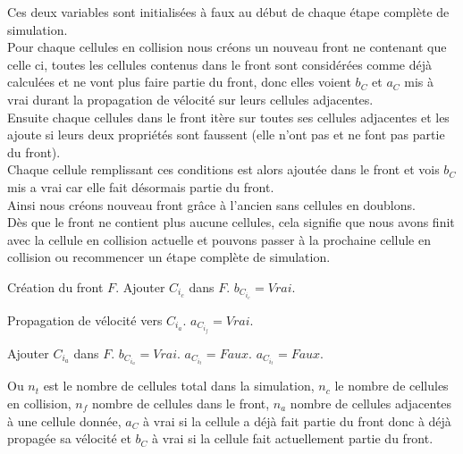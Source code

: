 \documentclass[a4paper,11pt]{article}
\begin{document}
Ces deux variables sont initialisées à faux au début de chaque étape complète de simulation.\\
Pour chaque cellules en collision nous créons un nouveau front ne contenant que celle ci, toutes les cellules contenus dans le front sont considérées comme déjà calculées et ne vont plus faire partie du front, donc elles voient $b_C$ et $a_C$ mis à vrai durant la propagation de vélocité sur leurs cellules adjacentes.\\
Ensuite chaque cellules dans le front itère sur toutes ses cellules adjacentes et les ajoute si leurs deux propriétés sont faussent (elle n'ont pas et ne font pas partie du front).\\
Chaque cellule remplissant ces conditions est alors ajoutée dans le front et vois $b_C$ mis a vrai car elle fait désormais partie du front.\\
Ainsi nous créons nouveau front grâce à l'ancien sans cellules en doublons.\\
Dès que le front ne contient plus aucune cellules, cela signifie que nous avons finit avec la cellule en collision actuelle et pouvons passer à la prochaine cellule en collision ou recommencer un étape complète de simulation. \\

\medbreak
\begin{algorithmic}[1]
   \STATE Création du front $F$.
      \STATE Ajouter $C_{i_c}$ dans $F$.
      \STATE $b_{C_{i_c}} = Vrai$.
      
	    \STATE Propagation de vélocité vers $C_{i_a}$.
	  \ENDIF
	\ENDFOR
	\STATE $a_{C_{i_f}} = Vrai$.
      \ENDFOR

	    \STATE Ajouter $C_{i_a}$ dans $F$.
	    \STATE $b_{C_{i_a}} = Vrai$.
	  \ENDIF
	\ENDFOR
      \ENDFOR
      \ENDWHILE
	\STATE $a_{C_{i_t}} = Faux$.
	\STATE $a_{C_{i_t}} = Faux$.
      \ENDFOR
   \ENDFOR
\end{algorithmic}
\medbreak

Ou $n_t$ est le nombre de cellules total dans la simulation, $n_c$ le nombre de cellules en collision, $n_f$ nombre de cellules dans le front, $n_a$ nombre de cellules adjacentes à une cellule donnée, $a_C$ à vrai si la cellule a déjà fait partie du front donc à déjà propagée sa vélocité et $b_C$ à vrai si la cellule fait actuellement partie du front. \\
\end{document}
